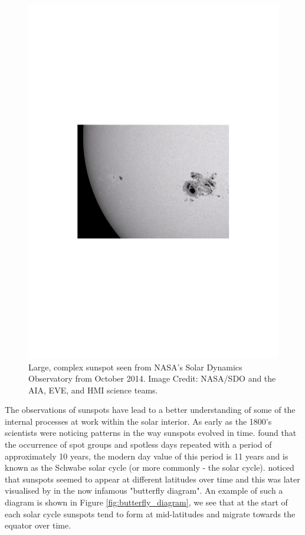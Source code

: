 \begin{figure}
    \centering
    \includegraphics[scale=0.7]{Figures/1-Introduction/HMI_spot_Oct}
    \caption[Example of complex sunspot as seen by NASA's SDO]{Large, complex sunspot seen from NASA's Solar Dynamics Observatory from October 2014. Image Credit: NASA/SDO and the AIA, EVE, and HMI science teams.}
    \label{fig:sunspot_example}
\end{figure}

The observations of sunspots have lead to a better understanding of some of the internal processes at work within the solar interior. As early as the 1800's scientists were noticing patterns in the way sunspots evolved in time. \citet{Schwabe_1844} found that the occurrence of spot groups and spotless days repeated with a period of approximately 10 years, the modern day value of this period is 11 years and is known as the Schwabe solar cycle (or more commonly - the solar cycle). \citet{Carrington_1858} noticed that sunspots seemed to appear at different latitudes over time and this was later visualised by \citet{Maunder_1904} in the now infamous "butterfly diagram". An example of such a diagram is shown in Figure \ref{fig:butterfly_diagram}, we see that at the start of each solar cycle sunspots tend to form at mid-latitudes and migrate towards the equator over time.

